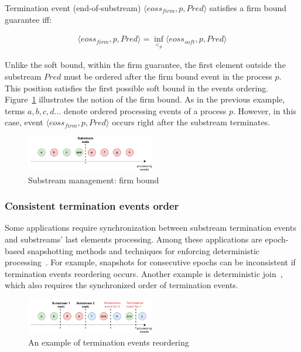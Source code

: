 \begin{definition}
Termination event (end-of-substream) $\langle eoss_{firm}, p, Pred\rangle$ satisfies a firm bound guarantee iff:

\begin{multline}
\langle eoss_{firm}, p, Pred\rangle = \inf_{<_p} \langle eoss_{soft}, p, Pred\rangle
\end{multline}
\end{definition}

Unlike the soft bound, within the firm guarantee, the first element outside the substream $Pred$ must be ordered after the firm bound event in the process $p$. This position satisfies the first possible soft bound in the events ordering. Figure~\ref{strict_guarantees} illustrates the notion of the firm bound. As in the previous example, terms $a,b,c,d...$ denote ordered processing events of a process $p$. However, in this case, event $\langle eoss_{firm}, p, Pred\rangle$ occurs right after the substream terminates.

\begin{figure}[t]
  \centering
  \includegraphics[width=0.50\textwidth]{pics/strict-guarantee.pdf}
  \caption{Substream management: firm bound}
  \label{strict_guarantees}
\end{figure}

\subsubsection{Consistent termination events order}
Some applications require synchronization between substream termination events and substreams' last elements processing. Among these applications are epoch-based snapshotting methods and techniques for enforcing deterministic processing~\cite{we2018adbis}. For example, snapshots for consecutive epochs can be inconsistent if termination events reordering occurs. Another example is deterministic join~\cite{gulisano2016scalejoin}, which also requires the synchronized order of termination events.

\begin{figure}[t]
  \centering
  \includegraphics[width=0.50\textwidth]{pics/notifications-reordering.pdf}
  \caption{An example of termination events reordering}
  \label{notifications_reordering}
\end{figure}

